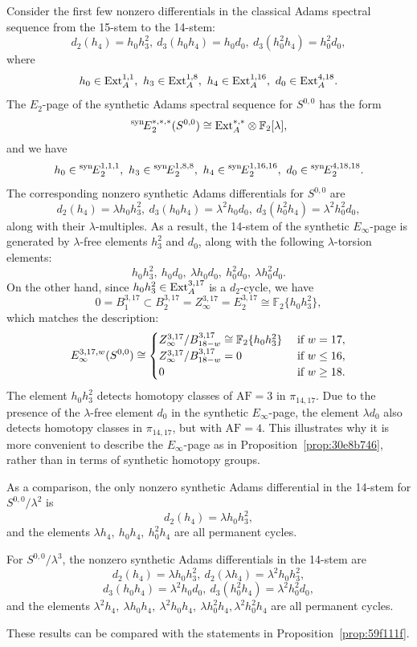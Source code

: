 \documentclass{amsart}
\numberwithin{equation}{section}
\newcommand{\AF}{\mathrm{AF}}
\newcommand{\SynSS}{\prescript{\mathrm{syn}\!}{}{E}}
\begin{document}
\begin{example} \label{exam:synEinfty}
    Consider the first few nonzero differentials in the classical Adams spectral sequence from the 15-stem to the 14-stem: 
    $$d_2(h_4) = h_0h_3^2,  \ d_3(h_0h_4) = h_0d_0, \ d_3(h_0^2h_4) = h_0^2d_0,$$
    where $$h_0 \in \mathrm{Ext}_A^{1,1}, \ h_3 \in \mathrm{Ext}_A^{1,8}, \ h_4 \in \mathrm{Ext}_A^{1,16}, \ d_0 \in \mathrm{Ext}_A^{4,18}.$$
    The $E_2$-page of the synthetic Adams spectral sequence for $S^{0,0}$ has the form
    $$\SynSS_2^{*,*,*}(S^{0,0}) \cong \Ext_A^{*,*}\otimes \mathbb{F}_2[\lambda],$$
    and we have
    $$h_0 \in \SynSS_2^{1,1,1}, \ h_3 \in \SynSS_2^{1,8,8}, \ h_4 \in \SynSS_2^{1,16,16}, \ d_0 \in \SynSS_2^{4,18,18}.$$
    The corresponding nonzero synthetic Adams differentials for $S^{0,0}$ are
    $$d_2(h_4) = \lambda h_0h_3^2,  \ d_3(h_0h_4) = \lambda^2 h_0d_0, \ d_3(h_0^2h_4) = \lambda^2 h_0^2d_0,$$
    along with their $\lambda$-multiples. As a result, the 14-stem of the synthetic $E_\infty$-page is generated by $\lambda$-free elements $h_3^2$ and $d_0$, along with the following $\lambda$-torsion elements:
    $$h_0h_3^2, \ h_0d_0, \ \lambda h_0d_0, \ h_0^2d_0, \ \lambda h_0^2d_0.$$
    On the other hand, since $h_0h_3^2 \in \mathrm{Ext}_A^{3,17}$ is a $d_2$-cycle, we have 
    $$0 = B_1^{3,17} \subset B_2^{3,17} = Z_\infty^{3,17} = E_2^{3,17} \cong \mathbb{F}_2\{h_0h_3^2\},$$
    which matches the description:
    $$E_\infty^{3,17,w}(S^{0,0})\cong\begin{cases}
        Z_\infty^{3,17}/B_{18-w}^{3,17} \cong \mathbb{F}_2\{h_0h_3^2\} & \text{ if } w = 17,\\
        Z_\infty^{3,17}/B_{18-w}^{3,17} = 0 & \text{ if } w \le 16,\\
        0 & \text{ if } w \ge 18.
    \end{cases}$$
    The element $h_0h_3^2$ detects homotopy classes of $\AF=3$ in $\pi_{14,17}$. Due to the presence of the $\lambda$-free element $d_0$ in the synthetic $E_\infty$-page, the element $\lambda d_0$ also detects homotopy classes in $\pi_{14,17}$, but with $\AF=4$. This illustrates why it is more convenient to describe the $E_\infty$-page as in Proposition~\ref{prop:30e8b746}, rather than in terms of synthetic homotopy groups.
    
    As a comparison, the only nonzero synthetic Adams differential in the 14-stem for $S^{0,0}/\lambda^2$ is 
    $$d_2(h_4) = \lambda h_0h_3^2,$$
    and the elements $\lambda h_4, \ h_0h_4, \ h_0^2h_4$ are all permanent cycles. 

    For $S^{0,0}/\lambda^3$, the nonzero synthetic Adams differentials in the 14-stem are
    $$d_2(h_4) = \lambda h_0h_3^2, \  d_2(\lambda h_4) = \lambda^2 h_0h_3^2,$$ 
    $$d_3(h_0h_4) = \lambda^2 h_0d_0, \ d_3(h_0^2h_4) = \lambda^2 h_0^2d_0,$$
    and the elements $\lambda^2 h_4, \ \lambda h_0h_4, \ \lambda^2 h_0h_4, \ \lambda h_0^2h_4, \lambda^2 h_0^2h_4$ are all permanent cycles. 

    These results can be compared with the statements in Proposition~\ref{prop:59f111f}.
\end{example}
\end{document}
